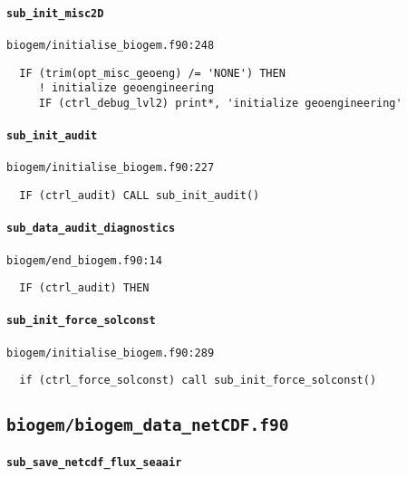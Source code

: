 \documentclass[a4paper,10pt,article]{memoir}
\begin{document}
\paragraph{\texttt{sub\_init\_misc2D}}

\texttt{biogem/initialise\_biogem.f90:248}

\begin{verbatim}
  IF (trim(opt_misc_geoeng) /= 'NONE') THEN
     ! initialize geoengineering
     IF (ctrl_debug_lvl2) print*, 'initialize geoengineering'
\end{verbatim}

\paragraph{\texttt{sub\_init\_audit}}

\texttt{biogem/initialise\_biogem.f90:227}

\begin{verbatim}
  IF (ctrl_audit) CALL sub_init_audit()
\end{verbatim}

\paragraph{\texttt{sub\_data\_audit\_diagnostics}}

\texttt{biogem/end\_biogem.f90:14}

\begin{verbatim}
  IF (ctrl_audit) THEN
\end{verbatim}

\paragraph{\texttt{sub\_init\_force\_solconst}}

\texttt{biogem/initialise\_biogem.f90:289}

\begin{verbatim}
  if (ctrl_force_solconst) call sub_init_force_solconst()
\end{verbatim}


\subsection*{\texttt{biogem/biogem\_data\_netCDF.f90}}

\paragraph{\texttt{sub\_save\_netcdf\_flux\_seaair}}
\end{document}
